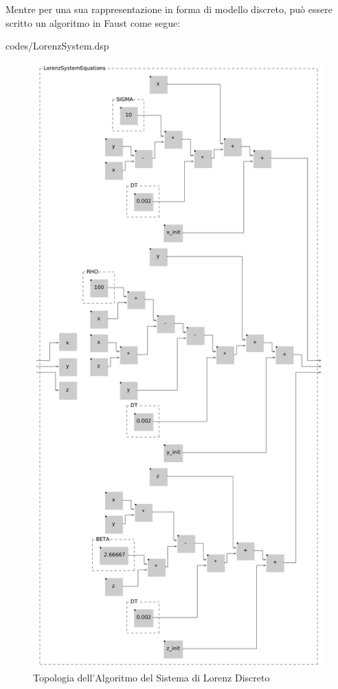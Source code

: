 Mentre per una sua rappresentazione in forma di modello discreto,
può essere scritto un algoritmo in Faust come segue:

\vspace{0.5cm} 

{codes/LorenzSystem.dsp}
\clearpage

\begin{figure}[h!]
\begin{center}
    \includegraphics[width=11.5cm]{figures/LorenzSystemInside.pdf} 
    \caption{Topologia dell'Algoritmo del Sistema di Lorenz Discreto} 
\end{center}
\vspace{0.5cm}
\end{figure}
\clearpage


